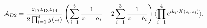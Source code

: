 \begin{equation}
{\cal A}_{D2}     =    {z_{12}z_{13}z_{14} \over 2 \prod_{i=1}^4
y(z_i)}  \left( \sum_{i=1}^6 {1\over z_1 - a_i}   - 2 \sum_{i=1}^3
{ 1 \over z_1 - b_i}\right)  \langle \prod_{i=1}^4 \hbox{e}^{i k_i
\cdot X(z_i, \bar z_i)} \rangle .
\end{equation}

